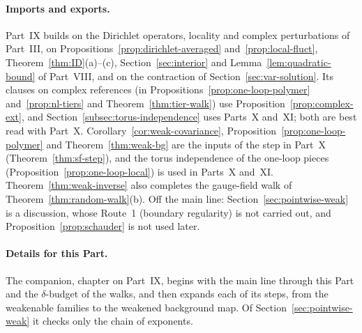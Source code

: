 \paragraph{Imports and exports.} Part~IX builds on the Dirichlet operators, locality and complex perturbations of Part~III, on Propositions~\ref{prop:dirichlet-averaged} and~\ref{prop:local-fluct}, Theorem~\ref{thm:ID}(a)--(c), Section~\ref{sec:interior} and Lemma~\ref{lem:quadratic-bound} of Part~VIII, and on the contraction of Section~\ref{sec:var-solution}. Its clauses on complex references (in Propositions~\ref{prop:one-loop-polymer} and~\ref{prop:nl-tiers} and Theorem~\ref{thm:tier-walk}) use Proposition~\ref{prop:complex-ext}, and Section~\ref{subsec:torus-independence} uses Parts~X and~XI; both are best read with Part~X. Corollary~\ref{cor:weak-covariance}, Proposition~\ref{prop:one-loop-polymer} and Theorem~\ref{thm:weak-bg} are the inputs of the step in Part~X (Theorem~\ref{thm:sf-step}), and the torus independence of the one-loop pieces (Proposition~\ref{prop:one-loop-local}) is used in Parts~X and~XI. Theorem~\ref{thm:weak-inverse} also completes the gauge-field walk of Theorem~\ref{thm:random-walk}(b). Off the main line: Section~\ref{sec:pointwise-weak} is a discussion, whose Route~1 (boundary regularity) is not carried out, and Proposition~\ref{prop:schauder} is not used later.

\paragraph{Details for this Part.} The companion, chapter on Part~IX, begins with the main line through this Part and the $\delta$-budget of the walks, and then expands each of its steps, from the weakenable families to the weakened background map. Of Section~\ref{sec:pointwise-weak} it checks only the chain of exponents.
